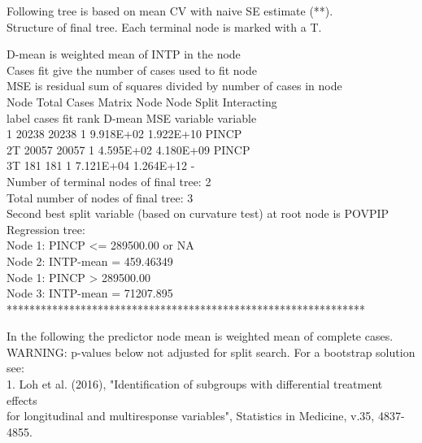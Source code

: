 \documentclass[12pt]{article}
\begin{document}
 Following tree is based on mean CV with naive SE estimate (**).\\
  
 Structure of final tree. Each terminal node is marked with a T.
  
 D-mean is weighted mean of INTP in the node\\
 Cases fit give the number of cases used to fit node\\
 MSE is residual sum of squares divided by number of cases in node\\
        Node    Total    Cases Matrix    Node      Node      Split          Interacting\\
        label   cases      fit  rank    D-mean     MSE       variable       variable\\
           1    20238    20238     1  9.918E+02  1.922E+10   PINCP \\
           2T   20057    20057     1  4.595E+02  4.180E+09   PINCP \\
           3T     181      181     1  7.121E+04  1.264E+12   - \\
 
 Number of terminal nodes of final tree: 2\\
 Total number of nodes of final tree: 3\\
 Second best split variable (based on curvature test) at root node is POVPIP\\
  
 Regression tree:\\
  
 Node 1: PINCP <= 289500.00 or NA\\
   Node 2: INTP-mean = 459.46349\\
 Node 1: PINCP > 289500.00\\
   Node 3: INTP-mean = 71207.895\\

 ***************************************************************
 
 In the following the predictor node mean is weighted mean of complete cases.\\
  
 WARNING: p-values below not adjusted for split search. For a bootstrap solution see:\\
  
 1. Loh et al. (2016), "Identification of subgroups with differential treatment effects\\
 for longitudinal and multiresponse variables", Statistics in Medicine, v.35, 4837-4855.\\
  
\end{document}
